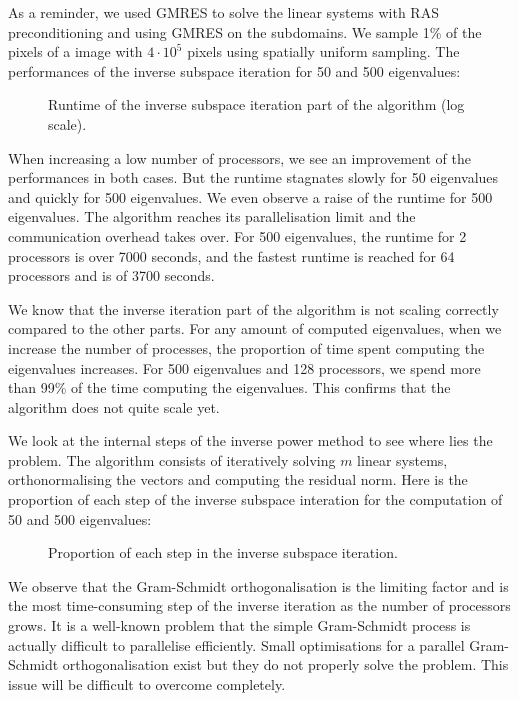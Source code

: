 As a reminder, we used GMRES to solve the linear systems with RAS preconditioning and using GMRES on the subdomains.
We sample 1\% of the pixels of a image with \(4 \cdot 10^5\) pixels using spatially uniform sampling.
The performances of the inverse subspace iteration for 50 and 500 eigenvalues:

\begin{figure}[H]
  \centering
  
  \caption{Runtime of the inverse subspace iteration part of the algorithm (log scale).}
\end{figure}

When increasing a low number of processors, we see an improvement of the performances in both cases.
But the runtime stagnates slowly for 50 eigenvalues and quickly for 500 eigenvalues.
We even observe a raise of the runtime for 500 eigenvalues.
The algorithm reaches its parallelisation limit and the communication overhead takes over.
For 500 eigenvalues, the runtime for 2 processors is over 7000 seconds, and the fastest runtime is reached for 64 processors and is of 3700 seconds.

We know that the inverse iteration part of the algorithm is not scaling correctly compared to the other parts.
For any amount of computed eigenvalues, when we increase the number of processes, the proportion of time spent computing the eigenvalues increases.
For 500 eigenvalues and 128 processors, we spend more than 99\% of the time computing the eigenvalues.
This confirms that the algorithm does not quite scale yet.

We look at the internal steps of the inverse power method to see where lies the problem.
The algorithm consists of iteratively solving \(m\) linear systems, orthonormalising the vectors and computing the residual norm.
Here is the proportion of each step of the inverse subspace interation for the computation of 50 and 500 eigenvalues:

\begin{figure}[H]
  \centering
  
  \caption{Proportion of each step in the inverse subspace iteration.}
\end{figure}

We observe that the Gram-Schmidt orthogonalisation is the limiting factor and is the most time-consuming step of the inverse iteration as the number of processors grows.
It is a well-known problem that the simple Gram-Schmidt process is actually difficult to parallelise efficiently.
Small optimisations for a parallel Gram-Schmidt orthogonalisation exist \cite{katagiri_parallel_gram_schmidt_2003} but they do not properly solve the problem.
This issue will be difficult to overcome completely.
